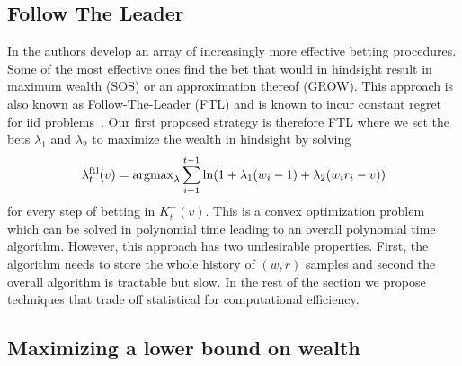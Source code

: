 \subsection{Follow The Leader}
In \cite{waudby-smith_variance-adaptive_2020} the authors develop
an array of increasingly more effective betting procedures. 
Some of the most effective ones find the bet that would in hindsight
result in maximum wealth (SOS) or an approximation thereof (GROW).
This approach is also known as Follow-The-Leader (FTL) and is 
known to incur constant regret for iid 
problems~\cite{de2014follow}. Our first proposed strategy 
is therefore FTL where we set the 
bets $\lambda_1$ and $\lambda_2$ to maximize the wealth in hindsight
by solving
\begin{equation}
\lambda_{t}^{\textrm{ftl}}(v) = \operatorname{argmax}_{\lambda} \sum_{i=1}^{t-1} \ln(1+\lambda_1 (w_i-1)+\lambda_2(w_i r_i - v)) \label{eq:ftl}
\end{equation}
for every step of betting in $K_t^{+}(v)$. This is a convex optimization problem which can be solved in polynomial time
leading to an overall polynomial time algorithm. However,
this approach has two undesirable properties. First, the 
algorithm needs to store the whole history of $(w,r)$ samples
and second the overall algorithm is tractable but slow.
In the rest of the section we propose techniques that trade off
statistical for computational efficiency.

\subsection{Maximizing a lower bound on wealth}

